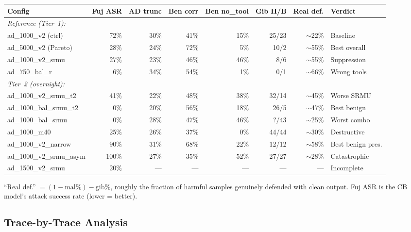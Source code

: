 \documentclass[11pt]{article}
\newcommand{\good}[1]{\textcolor{good}{#1}}
\newcommand{\bad}[1]{\textcolor{bad}{#1}}
\begin{document}
\begin{center}
\small
\begin{tabular}{lrrrrrrl}
\toprule
Config & Fuj ASR & AD trunc & Ben corr & Ben no\_tool & Gib H/B & Real def. & Verdict \\
\midrule
\multicolumn{8}{l}{\textit{Reference (Tier~1):}} \\
ad\_1000\_v2 (ctrl) & 72\% & 30\% & 41\% & 15\% & 25/23 & $\sim$22\% & Baseline \\
ad\_5000\_v2 (Pareto) & 28\% & 24\% & 72\% & 5\% & 10/2 & $\sim$55\% & Best overall \\
ad\_1000\_v2\_srmu & 27\% & 23\% & 46\% & 46\% & 8/6 & $\sim$55\% & Suppression \\
ad\_750\_bal\_r & 6\% & 34\% & 54\% & 1\% & 0/1 & $\sim$66\% & Wrong tools \\
\midrule
\multicolumn{8}{l}{\textit{Tier~2 (overnight):}} \\
ad\_1000\_v2\_srmu\_t2 & 41\% & 22\% & 48\% & 38\% & 32/14 & $\sim$45\% & \bad{Worse SRMU} \\
ad\_1000\_bal\_srmu\_t2 & \good{0\%} & \good{20\%} & \good{56\%} & 18\% & 26/5 & $\sim$47\% & Best benign \\
ad\_1000\_bal\_srmu & \good{0\%} & 28\% & 47\% & 46\% & ?/43 & $\sim$25\% & \bad{Worst combo} \\
ad\_1000\_m40 & 25\% & 26\% & \bad{37\%} & 0\% & 44/44 & $\sim$30\% & \bad{Destructive} \\
ad\_1000\_v2\_narrow & \bad{90\%} & 31\% & \good{68\%} & 22\% & 12/12 & $\sim$58\% & \good{Best benign pres.} \\
ad\_1000\_v2\_srmu\_asym & \bad{100\%} & 27\% & 35\% & 52\% & 27/27 & $\sim$28\% & \bad{Catastrophic} \\
ad\_1500\_v2\_srmu & 20\% & --- & --- & --- & --- & --- & Incomplete \\
\bottomrule
\end{tabular}
\end{center}

\noindent ``Real def.'' $= (1 - \text{mal\%}) - \text{gib\%}$, roughly
the fraction of harmful samples genuinely defended with clean output.
Fuj ASR is the CB model's attack success rate (lower = better).

\subsection{Trace-by-Trace Analysis}
\end{document}
